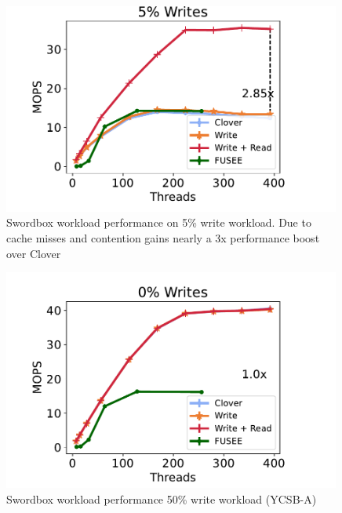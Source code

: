 \begin{figure}
    \center
    \includegraphics[width=0.99\textwidth]{fig/full_system_performance-b.pdf}
    \caption{Swordbox workload performance on 5\% write workload. Due to cache misses and contention \sword gains nearly a 3x performance boost over Clover}
    \label{fig:full_system_performance-b}
\end{figure}
\begin{figure}
    \center
    \includegraphics[width=0.99\textwidth]{fig/full_system_performance-a.pdf}
    \caption{Swordbox workload performance 50\% write workload (YCSB-A)}
    \label{fig:full_system_performance-a}
\end{figure}
